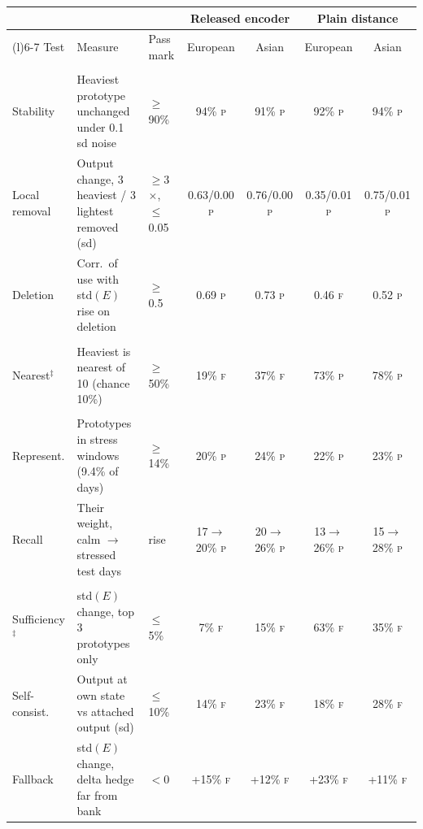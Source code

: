 \begin{tabular}{@{}>{\raggedright\arraybackslash}p{1.6cm}>{\raggedright\arraybackslash}p{3.45cm}>{\raggedright\arraybackslash}p{0.8cm}cccc@{}}
\toprule
 & & & \multicolumn{2}{c}{Released encoder} & \multicolumn{2}{c}{Plain distance} \\
\cmidrule(lr){4-5}\cmidrule(l){6-7}
Test & Measure & Pass mark & European & Asian & European & Asian \\
\midrule
\multicolumn{7}{@{}l}{\emph{Influence}} \\
Stability & Heaviest prototype unchanged under 0.1 sd noise & $\ge$90\% & 94\% \textsc{p} & 91\% \textsc{p} & 92\% \textsc{p} & 94\% \textsc{p} \\
Local removal & Output change, 3 heaviest / 3 lightest removed (sd) & $\ge$3$\times$, $\le$0.05 & 0.63/0.00 \textsc{p} & 0.76/0.00 \textsc{p} & 0.35/0.01 \textsc{p} & 0.75/0.01 \textsc{p} \\
Deletion & Corr.\ of use with std$(E)$ rise on deletion & $\ge$0.5 & 0.69 \textsc{p} & 0.73 \textsc{p} & 0.46 \textsc{f} & 0.52 \textsc{p} \\
\midrule
\multicolumn{7}{@{}l}{\emph{Visible similarity}} \\
Nearest$^{\ddagger}$ & Heaviest is nearest of 10 (chance 10\%) & $\ge$50\% & 19\% \textsc{f} & 37\% \textsc{f} & 73\% \textsc{p} & 78\% \textsc{p} \\
\midrule
\multicolumn{7}{@{}l}{\emph{Crisis correspondence}} \\
Represent. & Prototypes in stress windows (9.4\% of days) & $\ge$14\% & 20\% \textsc{p} & 24\% \textsc{p} & 22\% \textsc{p} & 23\% \textsc{p} \\
Recall & Their weight, calm $\to$ stressed test days & rise & 17$\to$20\% \textsc{p} & 20$\to$26\% \textsc{p} & 13$\to$26\% \textsc{p} & 15$\to$28\% \textsc{p} \\
\midrule
\multicolumn{7}{@{}l}{\emph{Reading and use}} \\
Sufficiency$^{\ddagger}$ & std$(E)$ change, top 3 prototypes only & $\le$5\% & 7\% \textsc{f} & 15\% \textsc{f} & 63\% \textsc{f} & 35\% \textsc{f} \\
Self-consist. & Output at own state vs attached output (sd) & $\le$10\% & 14\% \textsc{f} & 23\% \textsc{f} & 18\% \textsc{f} & 28\% \textsc{f} \\
Fallback & std$(E)$ change, delta hedge far from bank & $<$0 & +15\% \textsc{f} & +12\% \textsc{f} & +23\% \textsc{f} & +11\% \textsc{f} \\
\bottomrule
\end{tabular}
